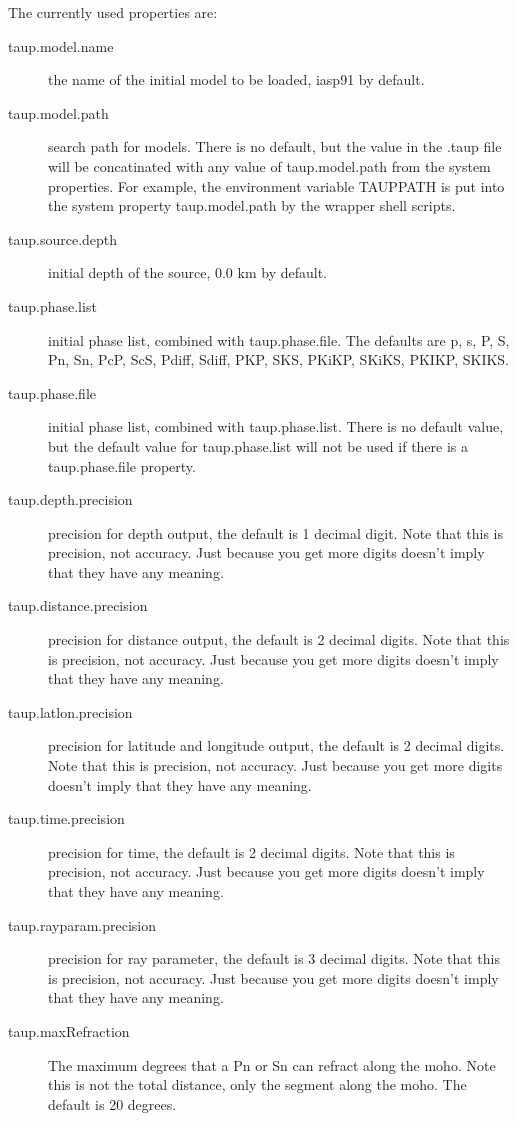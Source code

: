 The currently used properties are:
\begin{description}

\item[taup.model.name] the name of the initial model to be loaded,
iasp91 by default.
\item[taup.model.path] search path for models. There is no default,
but the value
in the .taup file will be concatinated with any value of taup.model.path
from the system properties. For example, the environment variable TAUPPATH
is put into the system property taup.model.path by the wrapper shell scripts.
\item[taup.source.depth] initial depth of the source, 0.0 km by default.
\item[taup.phase.list] initial phase list, combined with taup.phase.file. The
defaults are p, s, P, S, Pn, Sn, PcP, ScS, Pdiff, Sdiff, PKP, SKS, PKiKP,
SKiKS, PKIKP, SKIKS.
\item[taup.phase.file] initial phase list, combined with taup.phase.list. There
is no default value, but the default value for taup.phase.list will not be
used if there is a taup.phase.file property.
\item[taup.depth.precision] precision for depth output, the default is 1 decimal digit.
 Note that this is precision, not accuracy. Just
because you get more digits doesn't imply that they have any meaning.
\item[taup.distance.precision] precision for distance output,
the default is 2 decimal digits.
Note that this
is precision, not accuracy. Just because you get more
digits doesn't imply that they have any meaning.
\item[taup.latlon.precision] precision for latitude and longitude output, the
default is 2 decimal digits.
Note that this is precision, not accuracy. Just because you get more
digits doesn't imply that they have any meaning.
\item[taup.time.precision] precision for time, the default is 2 decimal digits.
Note that this is precision, not accuracy. Just because you get more
digits doesn't imply that they have any meaning.
\item[taup.rayparam.precision] precision for ray parameter, the default is 3 decimal digits.
Note that this is precision, not accuracy. Just because you get more
 digits doesn't imply that they have any meaning.
\item[taup.maxRefraction] The maximum degrees that a Pn or Sn can refract along the moho. Note this
 is not the total distance, only the segment along the moho. The default is 20 degrees.

\end{description}
